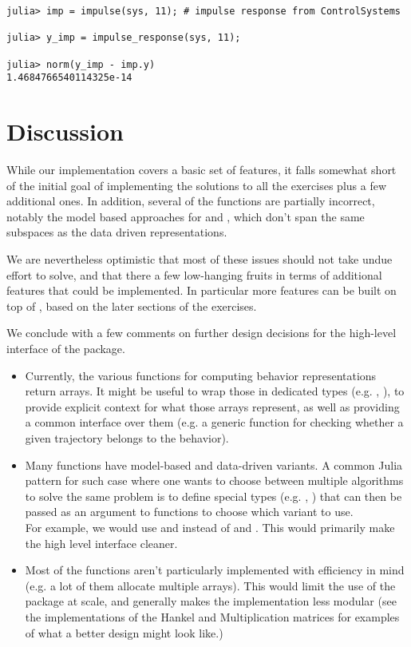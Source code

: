 \documentclass[11pt]{article}
\begin{document}
\begin{codebox}
\begin{verbatim}
julia> imp = impulse(sys, 11); # impulse response from ControlSystems

julia> y_imp = impulse_response(sys, 11);

julia> norm(y_imp - imp.y)
1.4684766540114325e-14
\end{verbatim}
\end{codebox}

\section*{Discussion}
While our implementation covers a basic set of features, it falls somewhat short of the initial goal of implementing the solutions to all the exercises plus a few additional ones. In addition, several of the functions are partially incorrect, notably the model based approaches for  and , which don't span the same subspaces as the data driven representations.

We are nevertheless optimistic that most of these issues should not take undue effort to solve, and that there a few low-hanging fruits in terms of additional features that could be implemented. In particular more features can be built on top of , based on the later sections of the exercises.

We conclude with a few comments on further design decisions for the high-level interface of the package.
\begin{itemize}
  \item Currently, the various functions for computing behavior representations return arrays. It might be useful to wrap those in dedicated types (e.g. , ), to provide explicit context for what those arrays represent, as well as providing a common interface over them (e.g. a generic function for checking whether a given trajectory belongs to the behavior).
  \item Many functions have model-based and data-driven variants. A common Julia pattern for such case where one wants to choose between multiple algorithms to solve the same problem is to define special types (e.g. , ) that can then be passed as an argument to functions to choose which variant to use.\\
  For example, we would use  and  instead of  and . This would primarily make the high level interface cleaner.
  \item Most of the functions aren't particularly implemented with efficiency in mind (e.g. a lot of them allocate multiple arrays). This would limit the use of the package at scale, and generally makes the implementation less modular (see the implementations of the Hankel and Multiplication matrices for examples of what a better design might look like.)
\end{itemize}

\newpage

\end{document}
